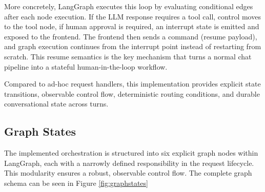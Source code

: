 More concretely, LangGraph executes this loop by evaluating conditional edges after each node execution. If the LLM response requires a tool call, control moves to the tool node, if human approval is required, an interrupt state is emitted and exposed to the frontend. The frontend then sends a command (resume payload), and graph execution continues from the interrupt point instead of restarting from scratch. This resume semantics is the key mechanism that turns a normal chat pipeline into a stateful human-in-the-loop workflow.

Compared to ad-hoc request handlers, this implementation provides explicit state transitions, observable control flow, deterministic routing conditions, and durable conversational state across turns.

\subsection{Graph States}
The implemented orchestration is structured into six explicit graph nodes within LangGraph, each with a narrowly defined responsibility in the request lifecycle. This modularity ensures a robust, observable control flow. The complete graph schema can be seen in Figure \ref{fig:graphstates}

